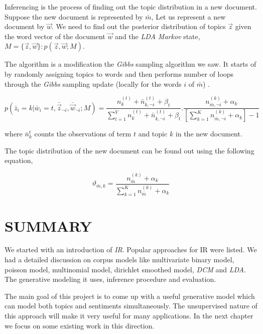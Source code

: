 Inferencing is the process of finding out the topic distribution in a new document. Suppose the new document is represented by \(\bar{m}\),
Let us represent a new document by \(\vec{w}\). We need to find out the posterior distribution of topics \(\vec{z}\) given the word 
vector of the document \(\vec{w}\) and the \textit{LDA Markov} state, \(M = \{ \vec{z},\vec{w} \} \colon p(\vec{z},\vec{w};M) \).

The algorithm is a modification the \textit{Gibbs} sampling algorithm we saw. It starts of by randomly assigning topics to words and then
performs number of loops through the \textit{Gibbs} sampling update (locally for the words \(i\) of \(\bar{m}\)) \citep*{heinrich2005parameter}.

\begin{equation}\label{eqn:inferencereqn}
p(\bar{z}_i=k | \bar{w}_i=t,\bar{\vec{z}}_{\neg i},\bar{\vec{w}}_{\neg i};M) =
\frac{n_{k}^{(t)} + \bar{n}_{k,\neg i}^{(t)} + \beta_t}{\sum_{t=1}^{V} n_{k}^{(t)} + \bar{n}_{k,\neg i}^{(t)} + \beta_t}.
\frac{n_{\bar{m},\neg i}^{(k)} + \alpha_k}{[\sum_{k=1}^{K} n_{\bar{m},\neg i}^{(k)} + \alpha_k]-1}
\end{equation}

where \(\bar{n}_{k}^{t}\) counts the observations of term \(t\) and topic \(k\) in the new document.

The topic distribution of the new document can be found out using the following equation,

\begin{equation}
\vartheta_{\bar{m},k} = \frac{n_{\bar{m}}^{(k)} + \alpha_k}{\sum_{k=1}^{K} n_{\bar{m}}^{(k)} + \alpha_k} 
\end{equation}

\section*{SUMMARY}

We started with an introduction of \textit{IR}. Popular approaches for IR were listed. We had a detailed discussion on corpus models like
multivariate binary model, poisson model, multinomial model, dirichlet smoothed model, \textit{DCM} and \textit{LDA}. The generative modeling it uses, 
inference procedure and evaluation. 

The main goal of this project is to come up with a useful generative model which can model both topics and sentiments simultaneously.
The unsupervised nature of this approach will make it very useful for many applications. In the next chapter we focus on some existing 
work in this direction.

\clearpage
